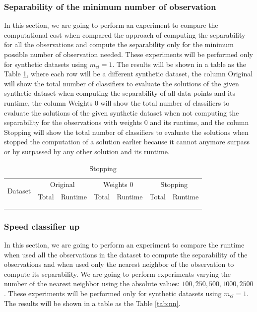 \documentclass[11pt]{article}
\begin{document}
{\subsubsection{Separability of the minimum number of observation}
In this section, we are going to perform an experiment to compare the computational cost when compared the approach of computing the separability for all the observations and compute the separability only for the minimum possible number of observation needed. These experiments will be performed only for synthetic datasets using $m_{cl} = 1$. The results will be shown in a table as the Table \ref{tab:stopping}, where each row will be a different synthetic dataset, the column Original will show the total number of classifiers to evaluate the solutions of the given synthetic dataset when computing the separability of all data points and its runtime, the column Weights 0 will show the total number of classifiers to evaluate the solutions of the given synthetic dataset when not computing the separability for the observations with weights 0 and its runtime, and the column Stopping will show the total number of classifiers to evaluate the solutions when stopped the computation of a solution earlier because it cannot anymore surpass or by surpassed by any other solution and its runtime.

\begin{table}[h!]
\centering
\caption{Stopping}
\label{tab:stopping}
\begin{tabular}{|l|ll|ll|ll|}
\hline
\multirow{2}{*}{Dataset} & \multicolumn{2}{c|}{Original} &  \multicolumn{2}{c|}{Weights 0} & \multicolumn{2}{c|}{Stopping} \\ \cline{2-7} 
                         & Total        & Runtime        & Total  & Runtime  & Total   & Runtime    \\ \hline
                         &              &                &        &          &         &  		    \\
                         &              &                &        &          &         &        	\\ \hline
\end{tabular}
\end{table}

\subsubsection{Speed classifier up}
In this section, we are going to perform an experiment to compare the runtime when used all the observations in the dataset to compute the separability of the observations and when used only the nearest neighbor of the observation to compute its separability. We are going to perform experiments varying the number of the nearest neighbor using the absolute values: ${100, 250, 500, 1000, 2500}$. These experiments will be performed only for synthetic datasets using $m_{cl} = 1$. The results will be shown in a table as the Table \ref{tab:nn}.

}
\end{document}
